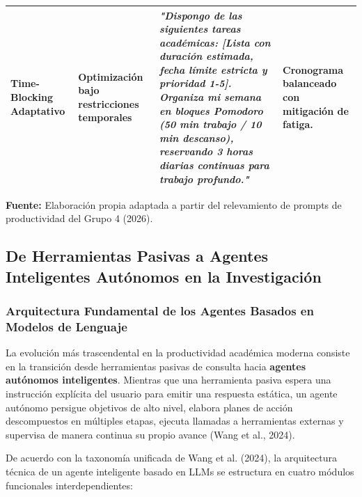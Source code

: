 \begin{table}[tbp]
\begin{tcolorbox}[colback=white, colframe=unmsm_gold, arc=3pt, boxrule=0.8pt, top=0.2cm, bottom=0.2cm, left=0.3cm, right=0.3cm]
\begin{tabularx}{\textwidth}{>{\raggedright\arraybackslash\bfseries}p{2.3cm} >{\raggedright\arraybackslash}p{3.2cm} >{\raggedright\arraybackslash}X >{\raggedright\arraybackslash}p{2.8cm}}
\addlinespace
Time-Blocking Adaptativo & Optimización bajo restricciones temporales & \textit{"Dispongo de las siguientes tareas académicas: [Lista con duración estimada, fecha límite estricta y prioridad 1-5]. Organiza mi semana en bloques Pomodoro (50 min trabajo / 10 min descanso), reservando 3 horas diarias continuas para trabajo profundo."} & Cronograma balanceado con mitigación de fatiga. \\
\bottomrule
\end{tabularx}
\vspace{0.35cm}
{\scriptsize \textbf{Fuente:} Elaboración propia adaptada a partir del relevamiento de prompts de productividad del Grupo 4 (2026).}
\end{tcolorbox}
\end{table}

\subsection{De Herramientas Pasivas a Agentes Inteligentes Autónomos en la Investigación}

\subsubsection{Arquitectura Fundamental de los Agentes Basados en Modelos de Lenguaje}

La evolución más trascendental en la productividad académica moderna consiste en la transición desde herramientas pasivas de consulta hacia \textbf{agentes autónomos inteligentes}. Mientras que una herramienta pasiva espera una instrucción explícita del usuario para emitir una respuesta estática, un agente autónomo persigue objetivos de alto nivel, elabora planes de acción descompuestos en múltiples etapas, ejecuta llamadas a herramientas externas y supervisa de manera continua su propio avance (Wang et al., 2024).

De acuerdo con la taxonomía unificada de Wang et al. (2024), la arquitectura técnica de un agente inteligente basado en LLMs se estructura en cuatro módulos funcionales interdependientes:

